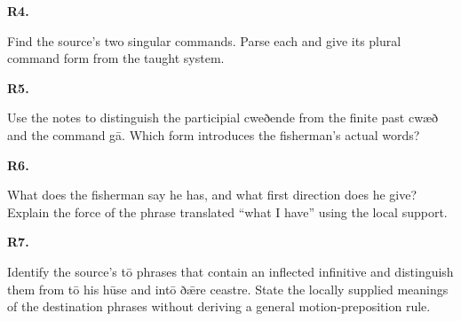 \par\begin{minipage}{\linewidth}\raggedright
\textbf{R4.}

Find the source’s two singular commands. Parse each and give its plural command form from the taught system.

\end{minipage}\par\addvspace{4pt}

\par\begin{minipage}{\linewidth}\raggedright
\textbf{R5.}

Use the notes to distinguish the participial cweðende from the finite past cwæð and the command gā. Which form introduces the fisherman’s actual words?

\end{minipage}\par\addvspace{4pt}

\par\begin{minipage}{\linewidth}\raggedright
\textbf{R6.}

What does the fisherman say he has, and what first direction does he give? Explain the force of the phrase translated “what I have” using the local support.

\end{minipage}\par\addvspace{4pt}

\par\begin{minipage}{\linewidth}\raggedright
\textbf{R7.}

Identify the source’s tō phrases that contain an inflected infinitive and distinguish them from tō his hūse and intō ðǣre ceastre. State the locally supplied meanings of the destination phrases without deriving a general motion-preposition rule.

\end{minipage}\par\addvspace{4pt}

